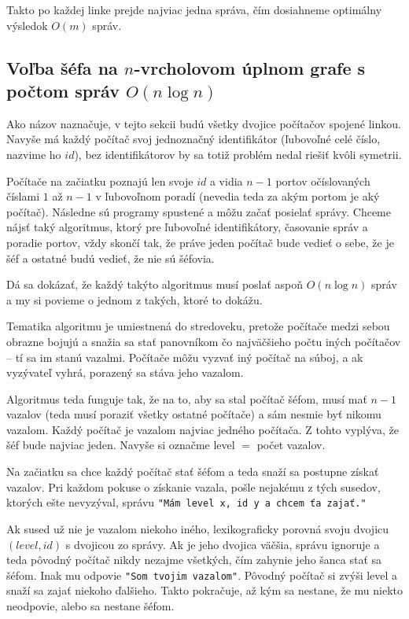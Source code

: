 Takto po každej linke prejde najviac jedna správa, čím dosiahneme optimálny výsledok $O(m)$ správ.

\subsection{Voľba šéfa na $n$-vrcholovom úplnom grafe s počtom správ $O(n\log n)$}

Ako názov naznačuje, v tejto sekcii budú všetky dvojice počítačov spojené linkou. 
Navyše má každý počítač svoj jednoznačný identifikátor (ľubovoľné celé číslo, nazvime ho $id$), bez identifikátorov
by sa totiž problém nedal riešiť kvôli symetrii.

Počítače na začiatku poznajú len svoje $id$ a vidia $n-1$ portov očíslovaných číslami $1$ až $n-1$ v
ľubovoľnom poradí (nevedia teda za akým portom je aký počítač). Následne sú programy spustené a môžu začať posielať správy.
Chceme nájsť taký algoritmus, ktorý pre ľubovoľné identifikátory, časovanie správ a poradie
portov, vždy skončí tak, že práve jeden počítač bude vedieť o sebe, že je šéf a ostatné budú vedieť, že nie sú šéfovia.

Dá sa dokázať, že každý takýto algoritmus musí poslať aspoň $O(n\log n)$ správ a my si povieme o
jednom z takých, ktoré to dokážu.

Tematika algoritmu je umiestnená do stredoveku, pretože počítače medzi sebou obrazne bojujú a snažia
sa stať panovníkom čo najväčšieho počtu iných počítačov -- tí sa im stanú vazalmi. 
Počítače môžu vyzvať iný počítač na súboj, a ak vyzývateľ vyhrá, porazený sa stáva jeho vazalom.

Algoritmus teda funguje tak, že na to, aby sa stal počítač šéfom, musí mať $n-1$ vazalov (teda musí
poraziť všetky ostatné počítače) a sám nesmie byť nikomu vazalom. Každý počítač je vazalom najviac 
jedného počítača. Z tohto vyplýva, že šéf bude najviac jeden. Navyše si označme level $=$ počet vazalov.

Na začiatku sa chce každý počítač stať šéfom a teda snaží sa postupne získať vazalov. Pri každom
pokuse o získanie vazala, pošle nejakému z tých susedov, ktorých ešte nevyzýval, správu \verb!"Mám level x, id y a chcem ťa zajať."! 

Ak sused už nie je vazalom niekoho iného, lexikograficky porovná svoju dvojicu $(level, id)$ s
dvojicou zo správy. 
Ak je jeho dvojica väčšia, správu ignoruje a teda pôvodný počítač nikdy nezajme všetkých, čím
zahynie jeho šanca stať sa šéfom. 
Inak mu odpovie \verb!"Som tvojim vazalom"!. Pôvodný počítač si zvýši level a snaží sa zajať niekoho
ďalšieho. Takto pokračuje, až kým sa nestane, že mu niekto neodpovie, alebo sa nestane šéfom.

